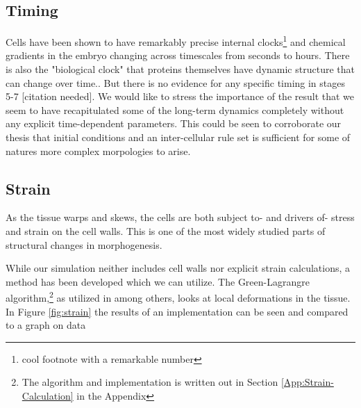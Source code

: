 \subsection{Timing}
Cells have been shown to have remarkably precise internal clocks\footnote{cool footnote with a remarkable number\cite{cellinternal}} and chemical gradients in the embryo changing across timescales from seconds to hours\cite{shvartsman2008dynamics}. There is also the "biological clock"\cite{johanolsen2} that proteins themselves have dynamic structure that can change over time.\cite{johanolsen1}. But there is no evidence for any specific timing in stages 5-7 [citation needed]. We would like to stress the importance of the result that we seem to have recapitulated some of the long-term dynamics completely without any explicit time-dependent parameters. This could be seen to corroborate our thesis that  initial conditions and an inter-cellular rule set is sufficient for some of natures more complex morpologies to arise. 


\subsection{Strain}
As the tissue warps and skews, the cells are both subject to- and drivers of- stress and strain on the cell walls. This is one of the most widely studied parts of structural changes in morphogenesis.

While our simulation neither includes cell walls nor explicit strain calculations, a method has been developed which we can utilize. The Green-Lagrangre algorithm,\footnote{The algorithm and implementation is written out in Section \ref{App:Strain-Calculation} in the Appendix} as utilized in  among others, looks at local deformations in the tissue. In Figure \ref{fig:strain} the results of an implementation can be seen and compared to a graph on data

